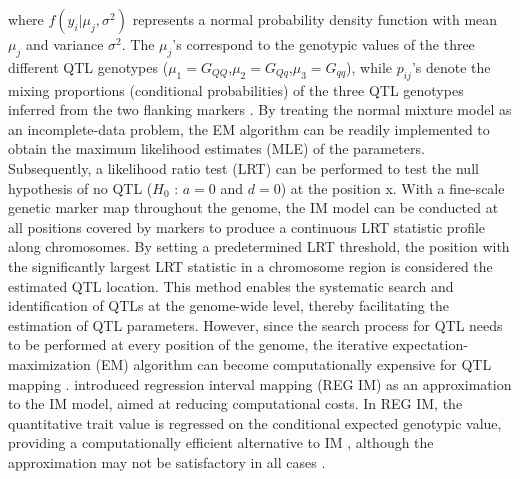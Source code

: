\noindent where $f\left(y_{i}|\mu_{j},\sigma^{2}\right)$ represents a normal probability density function with mean $\mu_{j}$ and variance $\sigma^{2}$. The $\mu_{j}$’s correspond to the genotypic values of the three different QTL genotypes ($\mu_{1}=G_{QQ}$,$\mu_{2}=G_{Qq}$,$\mu_{3}=G_{qq}$), while $p_{ij}$’s denote the mixing proportions (conditional probabilities) of the three QTL genotypes inferred from the two flanking markers \citep[refer to ][for obtaining $p_{ij}$’s in various experimental populations]{Kao-2009}. By treating the normal mixture model as an incomplete-data problem, the EM algorithm \citep{Dempster-1977} can be readily implemented to obtain the maximum likelihood estimates (MLE) of the parameters. Subsequently, a likelihood ratio test (LRT) can be performed to test the null hypothesis of no QTL ($H_{0}$ : $a=0$ and $d=0$) at the position x. With a fine-scale genetic marker map throughout the genome, the IM model can be conducted at all positions covered by markers to produce a continuous LRT statistic profile along chromosomes. By setting a predetermined LRT threshold, the position with the significantly largest LRT statistic in a chromosome region is considered the estimated QTL location. This method enables the systematic search and identification of QTLs at the genome-wide level, thereby facilitating the estimation of QTL parameters. However, since the search process for QTL needs to be performed at every position of the genome, the iterative expectation-maximization (EM) algorithm can become computationally expensive for QTL mapping \citep{Haley-1992, Kao-2000}. \citet{Haley-1992} introduced regression interval mapping (REG IM) as an approximation to the IM model, aimed at reducing computational costs. In REG IM, the quantitative trait value is regressed on the conditional expected genotypic value, providing a computationally efficient alternative to IM \citep{Haley-1992}, although the approximation may not be satisfactory in all cases \citep{Kao-2000, Sen-2001}.

